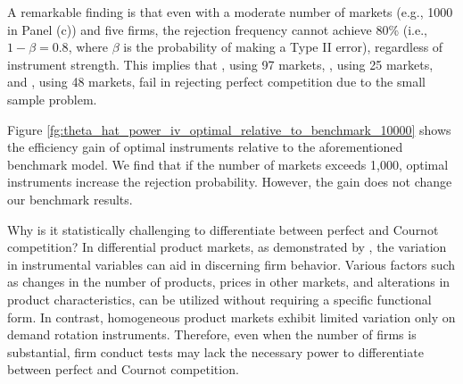 \documentclass[11pt, a4paper]{article}
\begin{document}
A remarkable finding is that even with a moderate number of markets (e.g., 1000 in Panel (c)) and five firms, the rejection frequency cannot achieve 80\% (i.e., $1-\beta=0.8$, where $\beta$ is the probability of making a Type II error), regardless of instrument strength.
This implies that \cite{genesove1998testing}, using 97 markets, \cite{shaffer1993test}, using 25 markets, and \cite{steen1999testing}, using 48 markets, fail in rejecting perfect competition due to the small sample problem.

Figure \ref{fg:theta_hat_power_iv_optimal_relative_to_benchmark_10000} shows the efficiency gain of optimal instruments relative to the aforementioned benchmark model. 
We find that if the number of markets exceeds 1,000, optimal instruments increase the rejection probability. 
However, the gain does not change our benchmark results.


Why is it statistically challenging to differentiate between perfect and Cournot competition?
In differential product markets, as demonstrated by \citet{berry2014identification}, the variation in instrumental variables can aid in discerning firm behavior. 
Various factors such as changes in the number of products, prices in other markets, and alterations in product characteristics, can be utilized without requiring a specific functional form.
In contrast, homogeneous product markets exhibit limited variation only on demand rotation instruments. 
Therefore, even when the number of firms is substantial, firm conduct tests may lack the necessary power to differentiate between perfect and Cournot competition.
\end{document}
